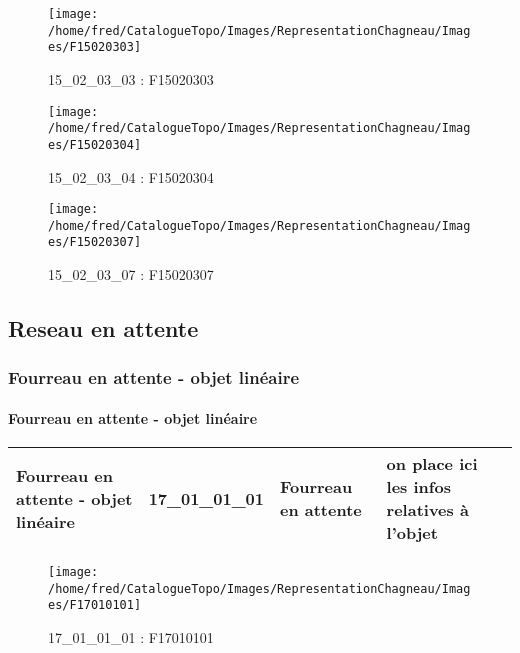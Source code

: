 \documentclass[12pt,titlepage,oneside]{book}
\begin{document}
\begin{figure}[h!]
  \hfill         %
  \begin{minipage}[t]{3cm}
    \begin{center}
      \texttt{[image: /home/fred/CatalogueTopo/Images/RepresentationChagneau/Images/F15020303]}
      \caption[F15020303]{\label{} 15\_02\_03\_03 : F15020303}
    \end{center}
  \end{minipage}
  \begin{minipage}[t]{3cm}
    \begin{center}
      \texttt{[image: /home/fred/CatalogueTopo/Images/RepresentationChagneau/Images/F15020304]}
      \caption[F15020304]{\label{} 15\_02\_03\_04 : F15020304}
    \end{center}
  \end{minipage}
  \begin{minipage}[t]{3cm}
    \begin{center}
      \texttt{[image: /home/fred/CatalogueTopo/Images/RepresentationChagneau/Images/F15020307]}
      \caption[F15020307]{\label{} 15\_02\_03\_07 : F15020307}
    \end{center}
  \end{minipage}
\end{figure}
\subsection{Reseau en attente}
\subsubsection{\large Fourreau en attente - objet linéaire}
\paragraph{Fourreau en attente - objet linéaire}
\noindent
\vspace{\baselineskip}

\renewcommand{\arraystretch}{1.2}
\begin{supertabular}{|p{10cm}|c|p{13cm}|p{12cm}|}
 Fourreau en attente - objet linéaire & 17\_01\_01\_01 & Fourreau en attente & on place ici les infos relatives à l'objet\\
\hline
\end{supertabular}
\begin{figure}[h!]
  \hfill         %
  \begin{minipage}[t]{3cm}
    \begin{center}
      \texttt{[image: /home/fred/CatalogueTopo/Images/RepresentationChagneau/Images/F17010101]}
      \caption[F17010101]{\label{} 17\_01\_01\_01 : F17010101}
    \end{center}
  \end{minipage}
\end{figure}
\end{document}
